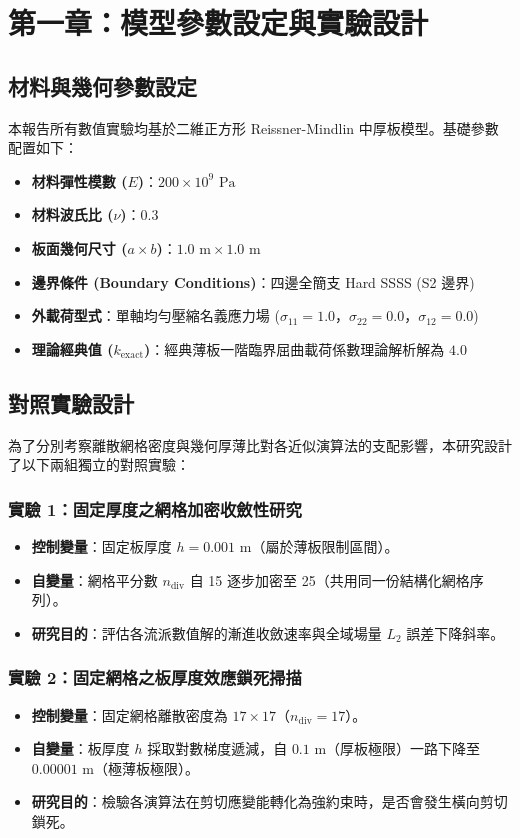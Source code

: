 \section{第一章：模型參數設定與實驗設計}
\label{sec:parameters}

\subsection{材料與幾何參數設定}
本報告所有數值實驗均基於二維正方形 Reissner-Mindlin 中厚板模型。基礎參數配置如下：
\begin{itemize}
    \item \textbf{材料彈性模數 ($E$)}：$200 \times 10^9 \text{ Pa}$
    \item \textbf{材料波氏比 ($\nu$)}：$0.3$
    \item \textbf{板面幾何尺寸 ($a \times b$)}：$1.0\text{ m} \times 1.0\text{ m}$
    \item \textbf{邊界條件 (Boundary Conditions)}：四邊全簡支 Hard SSSS (S2 邊界)
    \item \textbf{外載荷型式}：單軸均勻壓縮名義應力場 ($\sigma_{11} = 1.0$，$\sigma_{22} = 0.0$，$\sigma_{12} = 0.0$)
    \item \textbf{理論經典值 ($k_{\text{exact}}$)}：經典薄板一階臨界屈曲載荷係數理論解析解為 \textbf{$4.0$}
\end{itemize}

\subsection{對照實驗設計}
為了分別考察離散網格密度與幾何厚薄比對各近似演算法的支配影響，本研究設計了以下兩組獨立的對照實驗：

\subsubsection{實驗 1：固定厚度之網格加密收斂性研究}
\begin{itemize}
    \item \textbf{控制變量}：固定板厚度 $h = 0.001 \text{ m}$（屬於薄板限制區間）。
    \item \textbf{自變量}：網格平分數 $n_{\mathrm{div}}$ 自 15 逐步加密至 25（共用同一份結構化網格序列）。
    \item \textbf{研究目的}：評估各流派數值解的漸進收斂速率與全域場量 $L_2$ 誤差下降斜率。
\end{itemize}

\subsubsection{實驗 2：固定網格之板厚度效應鎖死掃描}
\begin{itemize}
    \item \textbf{控制變量}：固定網格離散密度為 $17 \times 17$（$n_{\mathrm{div}} = 17$）。
    \item \textbf{自變量}：板厚度 $h$ 採取對數梯度遞減，自 $0.1 \text{ m}$（厚板極限）一路下降至 $0.00001 \text{ m}$（極薄板極限）。
    \item \textbf{研究目的}：檢驗各演算法在剪切應變能轉化為強約束時，是否會發生橫向剪切鎖死。
\end{itemize}